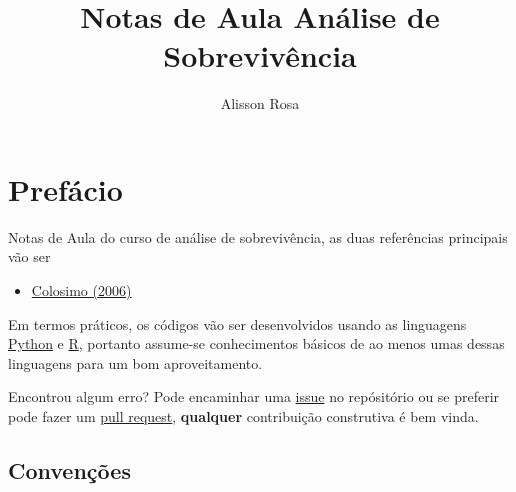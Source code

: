 \documentclass[
  letterpaper,
  DIV=11,
  numbers=noendperiod]{scrreprt}
\title{Notas de Aula Análise de Sobrevivência}
\author{Alisson Rosa}
\date{}
\providecommand{\tightlist}{%
  \setlength{\itemsep}{0pt}\setlength{\parskip}{0pt}}
\renewcommand*\contentsname{Índice}
\begin{document}
\maketitle

\ifdefined\Shaded\renewenvironment{Shaded}{\begin{tcolorbox}[frame hidden, boxrule=0pt, borderline west={3pt}{0pt}{shadecolor}, enhanced, sharp corners, interior hidden, breakable]}{\end{tcolorbox}}\fi

\renewcommand*\contentsname{Índice}
{
\hypersetup{linkcolor=}
\setcounter{tocdepth}{2}
\tableofcontents
}
\hypertarget{prefuxe1cio}{%
\chapter*{Prefácio}\label{prefuxe1cio}}

Notas de Aula do curso de análise de sobrevivência, as duas referências
principais vão ser

\begin{itemize}
\tightlist
\item
  \href{https://www.amazon.com.br/Análise-Sobrevivência-Aplicada-Antônio-Colosimo/dp/8521203845/ref=sr_1_1?__mk_pt_BR=ÅMÅŽÕÑ\&crid=260N5UFSK3T68\&keywords=analise+de+sobrevivencia+aplicada\&qid=1650511608\&sprefix=analise+de+sobrevivencia+aplica\%2Caps\%2C216\&sr=8-1\&ufe=app_do\%3Aamzn1.fos.6121c6c4-c969-43ae-92f7-cc248fc6181d}{Colosimo
  (2006)}
\end{itemize}

Em termos práticos, os códigos vão ser desenvolvidos usando as
linguagens \href{https://www.python.orghttps://www.python.org}{Python} e
\href{https://www.r-project.org}{R}, portanto assume-se conhecimentos
básicos de ao menos umas dessas linguagens para um bom aproveitamento.

Encontrou algum erro? Pode encaminhar uma
\href{https://github.com/AlissonRP/survival_analysis/issues}{issue} no
repósitório ou se preferir pode fazer um
\href{https://github.com/AlissonRP/survival_analysis/pulls}{pull
request}, \textbf{qualquer} contribuição construtiva é bem vinda.

\hypertarget{convenuxe7uxf5es}{%
\section*{Convenções}\label{convenuxe7uxf5es}}
\end{document}
